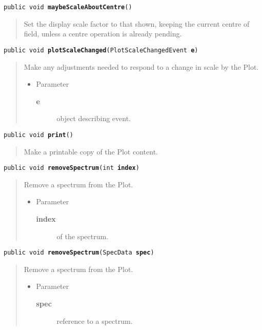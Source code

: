 \documentclass[twoside,11pt,nolof]{starlink}
\providecommand{\method}[1]{\texttt{#1}}
\newenvironment{desc}{\begin{quote}}{\end{quote}}
\begin{document}
\method{public void \textbf{maybeScaleAboutCentre}()\label{l186}\label{l187}}
\begin{desc}Set the display scale factor to that shown, keeping the current
 centre of field, unless a centre operation is already pending.
\end{desc}

\method{public void \textbf{plotScaleChanged}(\texttt{PlotScaleChangedEvent} \textbf{e})\label{l188}\label{l189}}
\begin{desc}Make any adjustments needed to respond to a change in scale by
 the Plot.
\begin{itemize}
\item{Parameter
  \begin{description}
   \item[\textbf{e}]{object describing event.}
  \end{description}}
\end{itemize}
\end{desc}

\method{public void \textbf{print}()\label{l190}\label{l191}}
\begin{desc}Make a printable copy of the Plot content.
\end{desc}

\method{public void \textbf{removeSpectrum}(\texttt{int} \textbf{index})\label{l192}\label{l193}}
\begin{desc}Remove a spectrum from the Plot.
\begin{itemize}
\item{Parameter
  \begin{description}
   \item[\textbf{index}]{of the spectrum.}
  \end{description}}
\end{itemize}
\end{desc}

\method{public void \textbf{removeSpectrum}(\texttt{SpecData} \textbf{spec})\label{l194}\label{l195}}
\begin{desc}Remove a spectrum from the Plot.
\begin{itemize}
\item{Parameter
  \begin{description}
   \item[\textbf{spec}]{reference to a spectrum.}
  \end{description}}
\end{itemize}
\end{desc}
\end{document}
